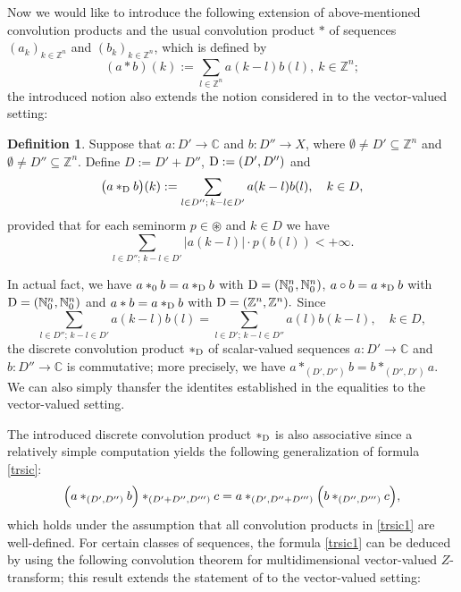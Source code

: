 \documentclass{amsart}
\theoremstyle{definition}
\newtheorem{defn}[thm]{Definition}
\theoremstyle{remark}
\numberwithin{equation}{section}
\begin{document}
Now we would like to introduce the following extension of above-mentioned convolution products and the usual convolution product $\ast$ of sequences $(a_{k})_{k\in {\mathbb Z}^{n}}$ and $(b_{k})_{k\in {\mathbb Z}^{n}}$, which is defined by  
$$
(a\ast b)(k):=\sum_{l\in {\mathbb Z}^{n}}a(k-l)b(l),\ k\in {\mathbb Z}^{n};
$$
the introduced notion also extends the notion considered in \cite[Definition 3.1.1]{gregor} to the vector-valued setting:

\begin{defn}\label{dcp}
Suppose that $a:D' \rightarrow {\mathbb C}$ and $b: D'' \rightarrow X$, where $\emptyset \neq D' \subseteq {\mathbb Z}^{n}$ and $\emptyset \neq D'' \subseteq {\mathbb Z}^{n}$. Define $D :=D'+D''$, ${\rm D}:=(D',D'')$ and
\begin{align}\label{pr}
\bigl(a \ast_{{\rm D}} b\bigr)(k):=\sum_{l\in D'';\, k-l\in D'}a(k-l)b(l) ,\quad k\in D,
\end{align}
provided that for each seminorm  $p\in \circledast$ and $k\in D$ we have $$\sum_{l\in D'';\, k-l\in D'}|a(k-l)| \cdot p(b(l))<+\infty.$$
\end{defn}

In actual fact, we have $a\ast_{0}b=a \ast_{{\rm D}} b$ with ${\rm D}=({\mathbb N}_{0}^{n},{\mathbb N}_{0}^{n})$, $a\circ b=a \ast_{{\rm D}} b$ with ${\rm D}=({\mathbb N}_{0}^{n},{\mathbb N}_{0}^{n})$ and $a\ast b=a \ast_{{\rm D}} b$ with ${\rm D}=({\mathbb Z}^{n},{\mathbb Z}^{n}).$
Since
$$
\sum_{l\in D'';\, k-l\in D'}a(k-l)b(l)=\sum_{l\in D';\, k-l\in D''}a(l)b(k-l),\quad k\in D,
$$
the discrete convolution product $\ast_{{\rm D}}$ of scalar-valued sequences $a:D' \rightarrow {\mathbb C}$ and $b: D'' \rightarrow {\mathbb C}$ is commutative; more precisely, we have $a \ast_{(D',D'')} b=b\ast_{(D'',D')}a.$ We can also simply thansfer the identites established in the equalities \cite[(3.1.3)]{gregor} to the vector-valued setting.

The introduced discrete convolution product $\ast_{{\rm D}}$ is also associative since a relatively simple computation yields the following generalization of formula \eqref{trsic}:
\begin{align}\label{trsic1}
\Bigl( a\ast_{(D',D'')} b\Bigr) \ast_{(D'+D'',D''')}c=a\ast_{(D',D''+D''')} \Bigl( b\ast_{(D'',D''')}c \Bigr),
\end{align}
which holds
under the assumption that all convolution products in \eqref{trsic1} are well-defined. For certain classes of sequences, the formula \eqref{trsic1} can be deduced by using the following convolution theorem for multidimensional vector-valued $Z$-transform; this result extends the statement of \cite[Theorem 3.1.4]{gregor} to the vector-valued setting:
\end{document}
